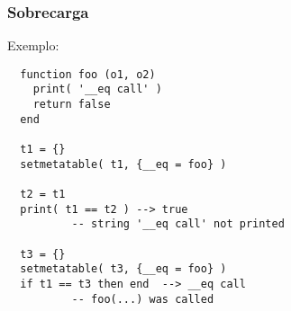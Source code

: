 
\begin{frame}[fragile]
  \frametitle{Sobrecarga}
  \begin{block}{}
    \centering
Exemplo:
  \begin{lstlisting}
  function foo (o1, o2) 
    print( '__eq call' )
    return false 
  end
  
  t1 = {}
  setmetatable( t1, {__eq = foo} )
  
  t2 = t1
  print( t1 == t2 ) --> true
          -- string '__eq call' not printed
  
  t3 = {}
  setmetatable( t3, {__eq = foo} )
  if t1 == t3 then end  --> __eq call
          -- foo(...) was called
  \end{lstlisting}
  \end{block}
\end{frame}

